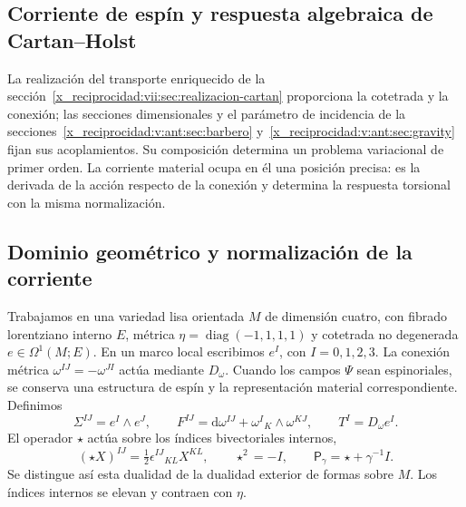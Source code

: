 \begin{HMTCompactSection}
\chapter{Corriente de espín y respuesta algebraica de Cartan--Holst}
\label{x_reciprocidad:vii:sec:corriente-respuesta-cartan}

La realización del transporte enriquecido de la
sección~\ref{x_reciprocidad:vii:sec:realizacion-cartan} proporciona la cotetrada y la
conexión; las secciones dimensionales y el parámetro de incidencia de la
secciones~\ref{x_reciprocidad:v:ant:sec:barbero} y~\ref{x_reciprocidad:v:ant:sec:gravity} fijan sus acoplamientos. Su composición
determina un problema variacional de primer orden. La corriente material
ocupa en él una posición precisa: es la derivada de la acción respecto de
la conexión y determina la respuesta torsional con la misma normalización.

\section{Dominio geométrico y normalización de la corriente}
\label{x_reciprocidad:vii:subsec:dominio-corriente-cartan}

Trabajamos en una variedad lisa orientada \(M\) de dimensión cuatro,
con fibrado lorentziano interno \(E\), métrica
\(\eta=\operatorname{diag}(-1,1,1,1)\) y cotetrada no degenerada
\(e\in\Omega^1(M;E)\). En un marco local escribimos
\(e^I\), con \(I=0,1,2,3\). La conexión métrica
\(\omega^{IJ}=-\omega^{JI}\) actúa mediante \(D_\omega\).
Cuando los campos \(\Psi\) sean espinoriales, se conserva una estructura
de espín y la representación material correspondiente. Definimos
\begin{equation}
 \Sigma^{IJ}=e^I\wedge e^J,\qquad
 F^{IJ}=\mathrm d\omega^{IJ}+\omega^I{}_{K}\wedge\omega^{KJ},
 \qquad T^I=D_\omega e^I.
 \label{x_reciprocidad:vii:eq:campos-cartan}
\end{equation}
El operador \(\star\) actúa sobre los índices bivectoriales internos,
\begin{equation}
 (\star X)^{IJ}=\tfrac12\epsilon^{IJ}{}_{KL}X^{KL},
 \qquad \star^2=-I,\qquad
 \mathsf P_\gamma=\star+\gamma^{-1}I.
 \label{x_reciprocidad:vii:eq:operador-holst}
\end{equation}
Se distingue así esta dualidad de la dualidad exterior de formas sobre
\(M\). Los índices internos se elevan y contraen con \(\eta\).


\end{HMTCompactSection}
